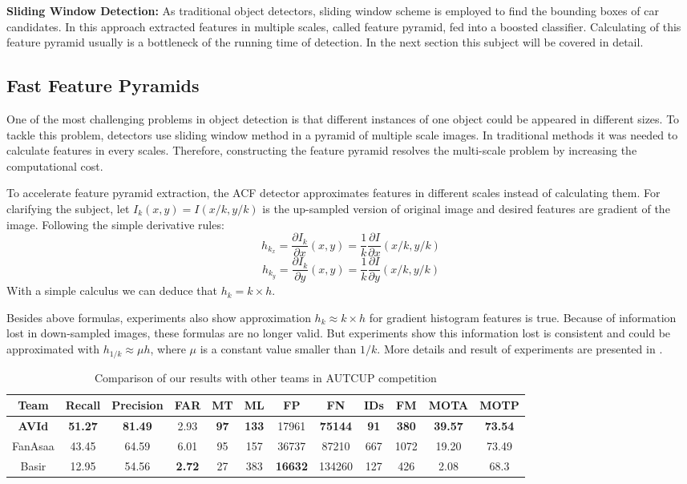 \documentclass[conference]{IEEEtran}
\begin{document}
\textbf{Sliding Window Detection:} As traditional object detectors, sliding window scheme is employed to find the bounding boxes of car candidates. In this approach extracted features in multiple scales, called feature pyramid, fed into a boosted classifier. Calculating of this feature pyramid usually is a bottleneck of the running time of detection. In the next section this subject will be covered in detail.

\subsection{Fast Feature Pyramids}
One of the most challenging problems in object detection is that different instances of one object could be appeared in different sizes. To tackle this problem, detectors use sliding window method in a pyramid of multiple scale images. In traditional methods it was needed to calculate features in every scales. Therefore, constructing the feature pyramid  resolves the multi-scale problem by increasing the computational cost.

 To accelerate feature pyramid extraction, the ACF detector approximates features in different scales instead of calculating them. For clarifying the subject, let $I_{k}(x,y)=I(x/k,y/k)$ is the up-sampled version of original image and desired features are gradient of the image. Following the simple derivative rules:
  $$h_{k_x} = \frac{\partial I_k}{\partial x}(x,y)=\frac{1}{k}\frac{\partial I}{\partial x}(x/k,y/k)$$ $$h_{k_y} = \frac{\partial I_k}{\partial y}(x,y)=\frac{1}{k}\frac{\partial I}{\partial y}(x/k,y/k)$$ With a simple calculus we can deduce that $h_k=k\times h$.
  
Besides above formulas, experiments also show approximation $h_{k}\approx k\times h$ for gradient histogram features is true.  Because of information lost in down-sampled images, these formulas are no longer valid. But experiments show this information lost is consistent and could be approximated with $h_{1/k}\approx \mu h$, where $\mu$ is a constant value smaller than $1/k$.
More details and result of experiments are presented in \cite{dollar2014fast}.
\begin{table}[t] \label{tableResult}
	\caption{Comparison of our results with other teams in AUTCUP competition}
	\centering
	\begin{tabular}{c||ccccccccccc}
		\hline
		Team&Recall&Precision&FAR&MT&ML&FP&FN&IDs&FM&MOTA&MOTP\\
		\hline
		\textbf{AVId}&\textbf{51.27}&\textbf{81.49}&2.93&\textbf{97}&\textbf{133}&17961&\textbf{75144}&\textbf{91}&\textbf{380}&\textbf{39.57}&\textbf{73.54}\\
		FanAsaa&43.45&64.59&6.01&95&157&36737&87210&667&1072&19.20&73.49\\
		Basir&12.95&54.56&\textbf{2.72}&27&383&\textbf{16632}&134260&127&426&2.08&68.3\\
		\hline
	\end{tabular}
	
\end{table}
\end{document}
